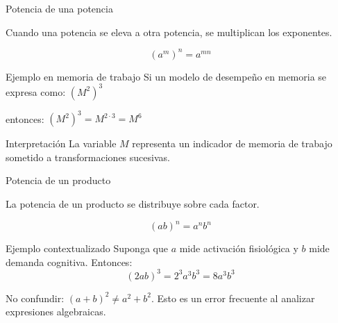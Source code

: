 \documentclass[handout,aspectratio=169]{beamer}
\begin{document}
	
	\begin{frame}{Potencia de una potencia}
		\begin{idea}
			Cuando una potencia se eleva a otra potencia, se multiplican los exponentes.
		\end{idea}
		
		\[
		(a^m)^n=a^{mn}
		\]
		
		\pause
		
		\begin{exampleblock}{Ejemplo en memoria de trabajo}
			Si un modelo de desempeño en memoria se expresa como:
			$(M^2)^3$
				
			entonces: $(M^2)^3=M^{2\cdot 3}=M^6$
		\end{exampleblock}
		
		\pause
		
		\begin{block}{Interpretación}
			La variable \(M\) representa un indicador de memoria de trabajo sometido a transformaciones sucesivas.
		\end{block}
	\end{frame}
	
	
	\begin{frame}{Potencia de un producto}
		\begin{idea}
			La potencia de un producto se distribuye sobre cada factor.
		\end{idea}		
		\[
		(ab)^n=a^n b^n
		\]
		
		\pause
		
		\begin{exampleblock}{Ejemplo contextualizado}
			Suponga que \(a\) mide activación fisiológica y \(b\) mide demanda cognitiva. Entonces:			
			\[
			(2ab)^3=2^3a^3b^3=8a^3b^3
			\]
		\end{exampleblock}
		
		\pause
		
		\begin{alerta}
			No confundir: $(a+b)^2\neq a^2+b^2$. Esto es un error frecuente al analizar expresiones algebraicas.
		\end{alerta}
	\end{frame}
	
	
\end{document}
